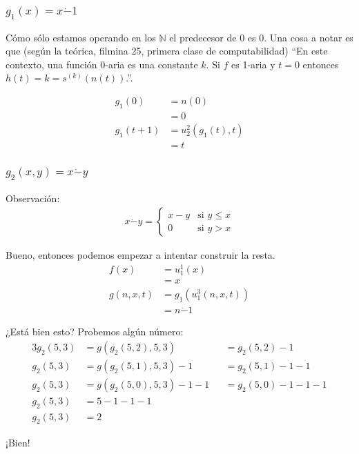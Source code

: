 \documentclass[fleqn, 11pt]{article}
\newcommand{\nat}{\mathbb{N}}
\begin{document}
\subsubsection{$g_1(x) = x \dot- 1$}

Cómo sólo estamos operando en los $\nat$ el predecesor de 0 es 0. Una cosa a
notar es que (según la teórica, filmina 25, primera clase de computabilidad)
``En este contexto, una función 0-aria es una constante $k$. Si $f$ es 1-aria y
$t = 0$ entonces $h(t) = k = s^{(k)}(n(t))$.''.

\begin{align*}
	g_1(0)     &= n(0)\\
	           &= 0 \\
	g_1(t + 1) &= u^2_2(g_1(t), t) \\
	           &= t
\end{align*}

\subsubsection{$g_2(x, y) = x \dot- y$}

Observación:
\begin{align*}
	x \dot- y =
	\begin{cases}
		x - y & \text{si } y \le x \\
		0     & \text{si } y > x
	\end{cases}
\end{align*}

Bueno, entonces podemos empezar a intentar construir la resta.
\begin{align*}
	f(x)       &= u^1_1(x) \\
	&= x \\
	g(n, x, t) &= g_1(u^3_1(n, x, t)) \\
	&= n \dot- 1
\end{align*}

¿Está bien esto? Probemos algún número:
\begin{alignat*}{3}
	g_2(5, 3) &= g(g_2(5, 2), 5, 3)         &&= g_2(5, 2) - 1 \\
	g_2(5, 3) &= g(g_2(5, 1), 5, 3) - 1     &&= g_2(5, 1) - 1 - 1 \\
	g_2(5, 3) &= g(g_2(5, 0), 5, 3) - 1 - 1 &&= g_2(5, 0) - 1 - 1 - 1 \\
	g_2(5, 3) &= 5 - 1 - 1 - 1 \\
	g_2(5, 3) &= 2
\end{alignat*}

¡Bien!
\end{document}
